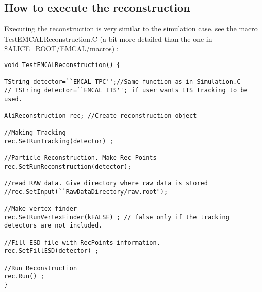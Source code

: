 \subsection{How to execute the reconstruction}

Executing the reconstruction is very similar to the simulation case, see the macro TestEMCALReconstruction.C (a bit more detailed than the one in \$ALICE\_ROOT/EMCAL/macros) :

\begin{DDbox}{\linewidth}
\begin{lstlisting}
void TestEMCALReconstruction() {

TString detector=``EMCAL TPC'';//Same function as in Simulation.C  
// TString detector=``EMCAL ITS''; if user wants ITS tracking to be used.

AliReconstruction rec; //Create reconstruction object 

//Making Tracking 
rec.SetRunTracking(detector) ;

//Particle Reconstruction. Make Rec Points 
rec.SetRunReconstruction(detector); 

//read RAW data. Give directory where raw data is stored
//rec.SetInput(``RawDataDirectory/raw.root");

//Make vertex finder 
rec.SetRunVertexFinder(kFALSE) ; // false only if the tracking detectors are not included.

//Fill ESD file with RecPoints information. 
rec.SetFillESD(detector) ; 

//Run Reconstruction 
rec.Run() ;
}
\end{lstlisting}
\end{DDbox}


